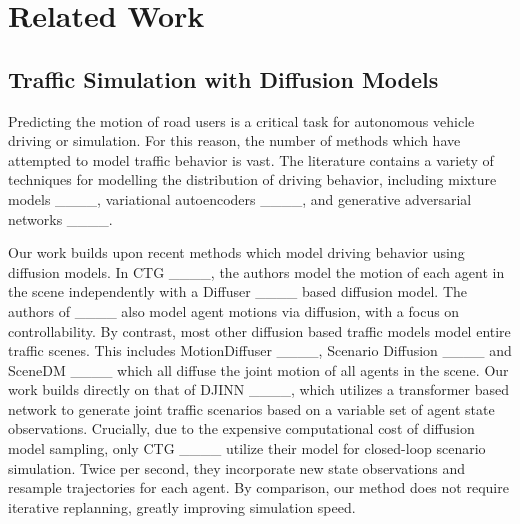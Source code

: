 \section{Related Work}
\subsection{Traffic Simulation with Diffusion Models}

Predicting the motion of road users is a critical task for autonomous vehicle driving or simulation. For this reason, the number of methods which have attempted to model traffic behavior is vast. The literature contains a variety of techniques for modelling the distribution of driving behavior, including mixture models ____, variational autoencoders ____, and generative adversarial networks ____. 

Our work builds upon recent methods which model driving behavior using diffusion models. In CTG ____, the authors model the motion of each agent in the scene independently with a Diffuser ____ based diffusion model. The authors of ____ also model agent motions via diffusion, with a focus on controllability. By contrast, most other diffusion based traffic models model entire traffic scenes. This includes MotionDiffuser ____, Scenario Diffusion ____ and SceneDM ____ which all diffuse the joint motion of all agents in the scene. Our work builds directly on that of DJINN ____, which utilizes a transformer based network to generate joint traffic scenarios based on a variable set of agent state observations. Crucially, due to the expensive computational cost of diffusion model sampling, only CTG ____ utilize their model for closed-loop scenario simulation. Twice per second, they incorporate new state observations and resample trajectories for each agent. By comparison, our method does not require iterative replanning, greatly improving simulation speed.

